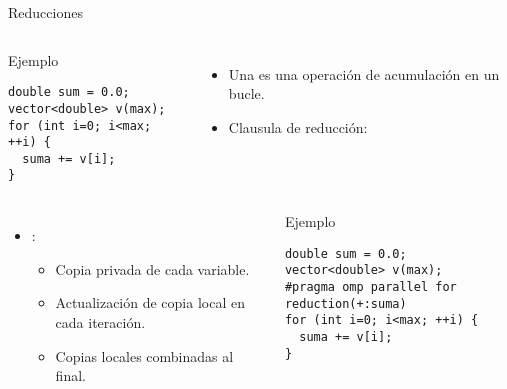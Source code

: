\begin{frame}[t,fragile,shrink=10]{Reducciones}
\begin{columns}


\begin{block}{Ejemplo}
\begin{lstlisting}
double sum = 0.0; 
vector<double> v(max);
for (int i=0; i<max; ++i) {
  suma += v[i];
}
\end{lstlisting}
\end{block}

\begin{itemize}
  \item Una  es una operación de acumulación
        en un bucle.
  \pause
  \item Clausula de reducción: 
\end{itemize}

\end{columns}


\begin{columns}


\begin{itemize}
  \item {}:
    \begin{itemize}
      \item Copia privada de cada variable.
      \item Actualización de copia local en cada iteración.
      \item Copias locales combinadas al final.
    \end{itemize}
\end{itemize}


\pause
\begin{block}{Ejemplo}
\begin{lstlisting}
double sum = 0.0; 
vector<double> v(max);
#pragma omp parallel for reduction(+:suma)
for (int i=0; i<max; ++i) {
  suma += v[i];
}
\end{lstlisting}
\end{block}

\end{columns}

\end{frame}

